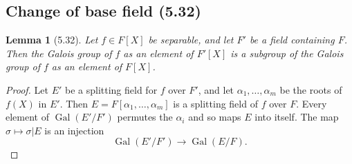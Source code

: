 \documentclass[UTF8,11pt,a4paper]{ctexart}
\newtheorem*{lemma}{Lemma}
\theoremstyle{definition}\newtheorem*{definition}{Definition}
\theoremstyle{remark}\newtheorem*{remark}{Remark}
\begin{document}
\subsection*{Change of base field (5.32)}
\begin{lemma}[5.32]
Let $f\in F[X]$ be separable, and let $F'$ be a field containing $F$. Then the Galois group of $f$ as an element of $F'[X]$ is a subgroup of the Galois group of $f$ as an element of $F[X]$.
\end{lemma}
\begin{proof}
Let $E'$ be a splitting field for $f$ over $F'$, and let $\alpha_1,\ldots,\alpha_m$ be the roots of $f(X)$ in $E'$. Then $E=F[\alpha_1,\ldots,\alpha_m]$ is a splitting field of $f$ over $F$. Every element of $\operatorname{Gal}(E'/F')$ permutes the $\alpha_i$ and so maps $E$ into itself. The map $\sigma\mapsto\sigma|E$ is an injection
\[
\operatorname{Gal}(E'/F')\longrightarrow\operatorname{Gal}(E/F).
\]
\end{proof}
\end{document}
